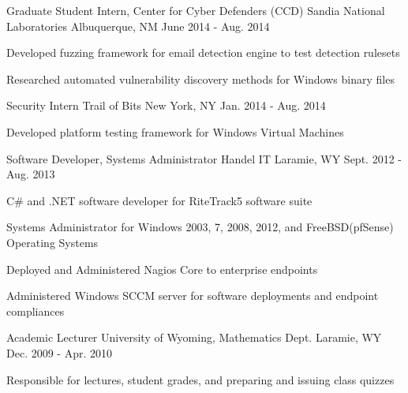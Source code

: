 \begin{cventries}
\cventry
{Graduate Student Intern, Center for Cyber Defenders (CCD)} %
{Sandia National Laboratories} %
{Albuquerque, NM} %
{June 2014 - Aug. 2014} %
{ %
\begin{cvitems}
\item {Developed fuzzing framework for email detection engine to test detection rulesets}
\item {Researched automated vulnerability discovery methods for Windows binary files}
\end{cvitems}
}


\cventry
{Security Intern} %
{Trail of Bits} %
{New York, NY} %
{Jan. 2014 - Aug. 2014} %
{ %
\begin{cvitems}
\item {Developed platform testing framework for Windows Virtual Machines}
\end{cvitems}
}


\cventry
{Software Developer, Systems Administrator} %
{Handel IT} %
{Laramie, WY} %
{Sept. 2012 - Aug. 2013} %
{ %
\begin{cvitems}
\item {C\# and .NET software developer for RiteTrack5 software suite}
\item {Systems Administrator for Windows 2003, 7, 2008, 2012, and FreeBSD(pfSense) Operating Systems}
\item {Deployed and Administered Nagios Core to enterprise endpoints}
\item {Administered Windows SCCM server for software deployments and endpoint compliances}
\end{cvitems} 
}


\begin{displaySection}
    \cventry
    {Academic Lecturer} %
    {University of Wyoming, Mathematics Dept.} %
    {Laramie, WY} %
    {Dec. 2009 - Apr. 2010} %
    { %
    \begin{cvitems}
    \item {Responsible for lectures, student grades, and preparing and issuing class quizzes}
    \end{cvitems}
    }


\end{displaySection}
\end{cventries}
